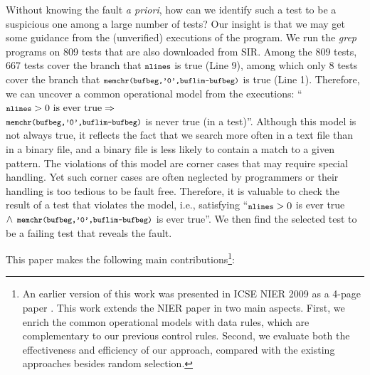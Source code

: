 \documentclass{sig-alternate}
\newcommand{\CodeIn}[1]{{\small\texttt{#1}}}
\begin{document}
Without knowing the fault \emph{a priori}, how can we identify such
a test to be a suspicious one among a large number of tests? Our
insight is that we may get some guidance from the (unverified)
executions of the program. We run the \emph{grep} programs on 809
tests that are also downloaded from SIR. Among the 809 tests, 667
tests cover the branch that $\CodeIn{nlines}$ is true (Line 9),
among which only 8 tests cover the branch that
$\CodeIn{memchr(bufbeg,'\\0',buflim-bufbeg)}$ is true (Line 1).
Therefore, we can uncover a common operational model from the
executions: ``$\CodeIn{nlines}>0 \textrm{ is ever true} \Rightarrow$
\\ $\CodeIn{memchr(bufbeg,'\\0',buflim-bufbeg)}$ is never true (in a
test)''. Although this model is not always true, it reflects the
fact that we search more often in a text file than in a binary file,
and a binary file is less likely to contain a match to a given
pattern. The violations of this model are corner cases that may
require special handling. Yet such corner cases are often neglected
by programmers or their handling is too tedious to be fault free.
Therefore, it is valuable to check the result of a test that
violates the model, i.e., satisfying ``$\CodeIn{nlines}>0$ is ever
true $\wedge \CodeIn{ memchr(bufbeg,'\\0',buflim-bufbeg)}$ is ever
true''. We then find the selected test to be a failing test that
reveals the fault.


This paper makes the following main contributions\footnote{An
earlier version of this work was presented in ICSE NIER 2009 as a
4-page paper \cite{Zheng09}. This work extends the NIER paper in two
main aspects. First, we enrich the common operational models with
data rules, which are complementary to our previous control rules.
Second, we evaluate both the effectiveness and efficiency of our
approach, compared with the existing approaches besides random
selection.}:
\end{document}
